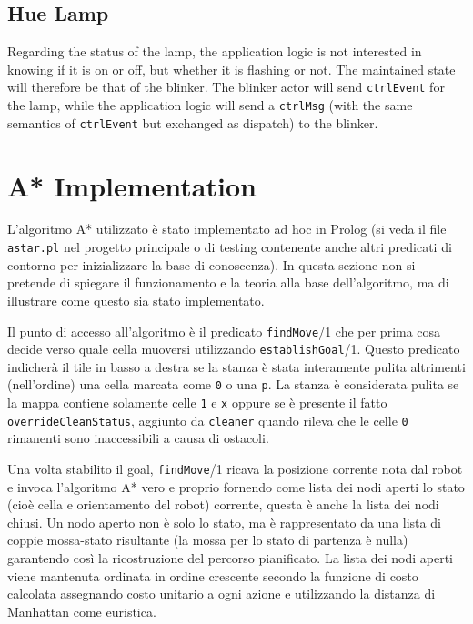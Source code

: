 \subsection{Hue Lamp}
Regarding the status of the lamp, the application logic is not interested in knowing if it is on or off, but whether it is flashing or not. The maintained state will therefore be that of the blinker. The blinker actor will send \texttt{ctrlEvent} for the lamp, while the application logic will send a \texttt{ctrlMsg} (with the same semantics of \texttt{ctrlEvent} but exchanged as dispatch) to the blinker.

\section{A* Implementation}\label{prt:astar_prolog}
L'algoritmo A* utilizzato è stato implementato ad hoc in Prolog (si veda il file \texttt{astar.pl} nel progetto principale o di testing contenente anche altri predicati di contorno per inizializzare la base di conoscenza). In questa sezione non si pretende di spiegare il funzionamento e la teoria alla base dell'algoritmo, ma di illustrare come questo sia stato implementato.

Il punto di accesso all'algoritmo è il predicato \texttt{findMove}/1 che per prima cosa decide verso quale cella muoversi utilizzando \texttt{establishGoal}/1. Questo predicato indicherà il tile in basso a destra se la stanza è stata interamente pulita altrimenti (nell'ordine) una cella marcata come \texttt{0} o una \texttt{p}.
La stanza è considerata pulita se la mappa contiene solamente celle \texttt{1} e \texttt{x} oppure se è presente il fatto \texttt{overrideCleanStatus}, aggiunto da \texttt{cleaner} quando rileva che le celle \texttt{0} rimanenti sono inaccessibili a causa di ostacoli.

Una volta stabilito il goal, \texttt{findMove}/1 ricava la posizione corrente nota dal robot e invoca l'algoritmo A* vero e proprio fornendo come lista dei nodi aperti lo stato (cioè cella e orientamento del robot) corrente, questa è anche la lista dei nodi chiusi. Un nodo aperto non è solo lo stato, ma è rappresentato da una lista di coppie mossa-stato risultante (la mossa per lo stato di partenza è nulla) garantendo così la ricostruzione del percorso pianificato. La lista dei nodi aperti viene mantenuta ordinata in ordine crescente secondo la funzione di costo calcolata assegnando costo unitario a ogni azione e utilizzando la distanza di Manhattan come euristica.

